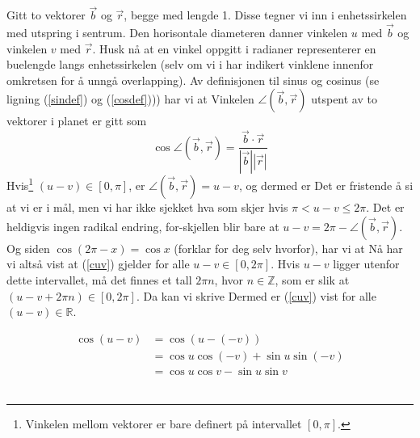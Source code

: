 Gitt to vektorer $ \vec{b} $ og $ \vec{r} $, begge med lengde 1. Disse tegner vi inn i enhetssirkelen med utspring i sentrum. Den horisontale diameteren danner vinkelen $ u$ med $ \vec{b} $ og vinkelen $ v $ med $ \vec{r} $. 
Husk nå at en vinkel oppgitt i radianer representerer en buelengde langs enhetssirkelen (selv om vi i  har indikert vinklene innenfor omkretsen for å unngå overlapping). Av definisjonen til sinus og cosinus (se ligning (\ref{sindef}) og (\ref{cosdef}))) har vi at
Vinkelen $ \angle(\vec{b}, \vec{r}) $ utspent av to vektorer i planet er gitt som
\[ \cos \angle(\vec b, \vec r) = \frac{\vec{b}\cdot \vec{r}}{|\vec{b}||\vec{r}|} \]
Hvis\footnote{Vinkelen mellom vektorer er bare definert på intervallet $ [0, \pi] $.} $ (u-v)\in[0, \pi] $, er $ \angle(\vec b, \vec r)=u-v $, og dermed er
Det er fristende å si at vi er i mål, men vi har ikke
sjekket hva som skjer hvis $ {\pi<u-v\leq2\pi} $. Det er
heldigvis ingen radikal endring, for-skjellen blir bare at 
$ {u-v=2\pi- \angle(\vec b, \vec r)}$. Og siden ${\cos
(2\pi-x)=\cos x} $ (forklar for deg selv hvorfor), har vi at
Nå har vi altså vist at (\ref{cuv}) gjelder for alle $ u-v\in[0, 2\pi] $. Hvis $ u-v $ ligger utenfor dette intervallet, må det finnes et tall $ 2\pi n $, hvor $ n\in \mathbb{Z} $, som er slik at $ (u-v+2\pi n) \in [0, 2\pi]$. Da kan vi skrive
Dermed er (\ref{cuv}) vist for alle $ (u-v) \in \mathbb{R}$. \vsk

\begin{align*}
\cos (u-v)&= \cos (u-(-v)) \\
&= \cos u \cos (-v) + \sin u \sin (-v) \\
&= \cos u \cos v - \sin u \sin v 
\end{align*} \\

